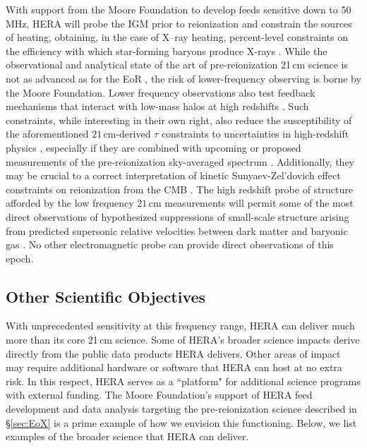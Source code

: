 \documentclass[preprint,11pt]{aastex}
\begin{document}
With support from the Moore Foundation to develop feeds sensitive down to 50\,MHz, HERA will probe the IGM prior to
reionization and constrain the sources of heating, obtaining, in the case of
X--ray heating, percent-level constraints on the efficiency with which star-forming baryons
produce X-rays \citep{ewall-wice_et_al2015}. While the observational and analytical state of the art of pre-reionization 21\,cm science is not as advanced as for the EoR \citep{ewall-wice_et_al2016-EoXLimits}, the risk of lower-frequency observing is borne by the Moore Foundation.
Lower
frequency observations also test feedback
mechanisms that interact with low-mass halos at high redshifts
\citep{Iliev_et_al2007,Iliev_et_al2012,ahn_et_al2012}.
Such constraints, while interesting in their own right, also reduce
the susceptibility of the aforementioned $21\,\textrm{cm}$-derived $\tau$
constraints to uncertainties in high-redshift physics \citep{liu_et_al2015}, especially if they are 
combined with upcoming or proposed measurements of 
the pre-reionization sky-averaged spectrum \citep{fialkov_and_loeb2016}. Additionally, they may be crucial to a correct
interpretation of kinetic Sunyaev-Zel'dovich effect constraints on reionization
from the CMB \citep{park_et_al2013}. The high redshift probe of
structure afforded by the low frequency $21\,\textrm{cm}$ measurements will
permit some of the most direct observations of hypothesized suppressions of
small-scale structure
\citep{dalal_et_al2010,tseliakhovich_et_al2011,fialkov_et_al2012} arising from
predicted supersonic relative velocities between dark matter and baryonic gas
\citep{tseliakhovich_and_hirata2010}. No other electromagnetic probe can provide direct observations of this
epoch. 


\subsection{Other Scientific Objectives}
\label{subsec:broader_science}

\noindent With unprecedented sensitivity at this frequency range, HERA can deliver much more than its core 21\,cm science. 
Some of HERA's broader science impacts derive directly from the public data products HERA delivers.  Other
areas of impact may require additional hardware or software that HERA can host at no extra risk. 
In this respect, HERA serves as a ``platform" for additional science programs with external funding.
The Moore Foundation's support of HERA feed development and data analysis targeting the pre-reionization science described in \S\ref{sec:EoX}
is a prime example of how we envision this functioning.
Below, we list examples of the broader science that HERA can deliver.
\end{document}
